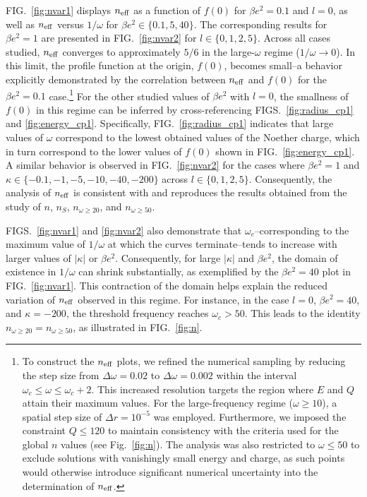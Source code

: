 \documentclass[aps,prd,superscriptaddress,notitlepage,11pt,final,longbibliography,nofootinbib]{revtex4-1}
\numberwithin{equation}{section}
\begin{document}
FIG.~\ref{fig:nvar1} displays $n_{\rm eff}$ as a function of $f(0)$ for $\beta e^2=0.1$ and $l=0$, as well as $n_{\rm eff}$ versus $1/\omega$ for $\beta e^2 \in \{0.1, 5, 40\}$. The corresponding results for $\beta e^2=1$ are presented in FIG.~\ref{fig:nvar2} for $l \in \{0, 1, 2, 5\}$. Across all cases studied, $n_{\rm eff}$ converges to approximately $5/6$ in the large-$\omega$ regime ($1/\omega \to 0$). In this limit, the profile function at the origin, $f(0)$, becomes small--a behavior explicitly demonstrated by the correlation between $n_{\rm eff}$ and $f(0)$ for the $\beta e^2=0.1$ case.\footnote{To construct the $n_{\rm eff}$ plots, we refined the numerical sampling by reducing the step size from $\Delta\omega = 0.02$ to $\Delta\omega = 0.002$ within the interval $\omega_c \leq \omega \leq \omega_c + 2$. This increased resolution targets the region where $E$ and $Q$ attain their maximum values. For the large-frequency regime ($\omega \geq 10$), a spatial step size of $\Delta r = 10^{-5}$ was employed. Furthermore, we imposed the constraint $Q \leq 120$ to maintain consistency with the criteria used for the global $n$ values (see Fig.~\ref{fig:n}). The analysis was also restricted to $\omega \leq 50$ to exclude solutions with vanishingly small energy and charge, as such points would otherwise introduce significant numerical uncertainty into the determination of $n_{\rm eff}$.} For the other studied values of $\beta e^2$ with $l=0$, the smallness of $f(0)$ in this regime can be inferred by cross-referencing FIGS.~\ref{fig:radius_cp1} and \ref{fig:energy_cp1}. Specifically, FIG.~\ref{fig:radius_cp1} indicates that large values of $\omega$ correspond to the lowest obtained values of the Noether charge, which in turn correspond to the lower values of $f(0)$ shown in FIG.~\ref{fig:energy_cp1}. A similar behavior is observed in FIG.~\ref{fig:nvar2} for the cases where $\beta e^2=1$ and $\kappa \in \{-0.1, -1, -5, -10, -40, -200\}$ across $l \in \{0, 1, 2, 5\}$. Consequently, the analysis of $n_{\rm eff}$ is consistent with and reproduces the results obtained from the study of $n$, $n_S$, $n_{\omega \geq 20}$, and $n_{\omega \geq 50}$.

FIGS.~\ref{fig:nvar1} and \ref{fig:nvar2} also demonstrate that $\omega_c$--corresponding to the maximum value of $1/\omega$ at which the curves terminate--tends to increase with larger values of $|\kappa|$ or $\beta e^2$. Consequently, for large $|\kappa|$ and $\beta e^2$, the domain of existence in $1/\omega$ can shrink substantially, as exemplified by the $\beta e^2 = 40$ plot in FIG.~\ref{fig:nvar1}. This contraction of the domain helps explain the reduced variation of $n_{\rm eff}$ observed in this regime. For instance, in the case $l = 0$, $\beta e^2 = 40$, and $\kappa = -200$, the threshold frequency reaches $\omega_c > 50$. This leads to the identity $n_{\omega \geq 20} = n_{\omega \geq 50}$, as illustrated in FIG.~\ref{fig:n}.
\end{document}

